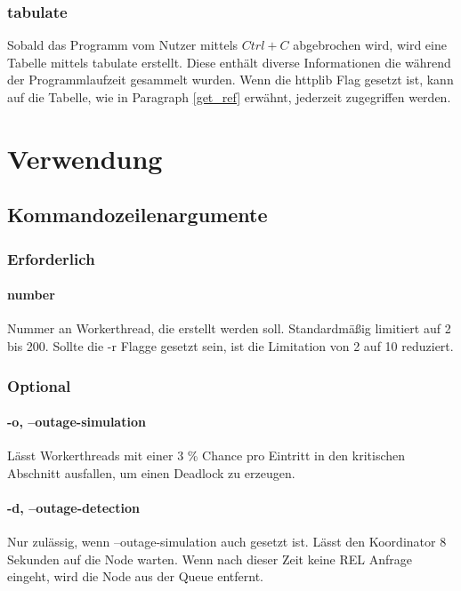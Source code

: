 \documentclass[12pt, letterpaper]{article}
\begin{document}
\subsubsection{tabulate}
Sobald das Programm vom Nutzer mittels $Ctrl+C$ abgebrochen wird, wird eine Tabelle mittels tabulate\cite{tabulate-ref} erstellt. Diese enthält diverse Informationen die während der Programmlaufzeit gesammelt wurden.
Wenn die httplib Flag gesetzt ist, kann auf die Tabelle, wie in Paragraph \ref{get_ref} erwähnt, jederzeit zugegriffen werden.

\section{Verwendung}
\label{usage}

\subsection{Kommandozeilenargumente}
\subsubsection{Erforderlich}

\paragraph{number}
Nummer an Workerthread, die erstellt werden soll. Standardmäßig limitiert auf 2 bis 200. Sollte die -r Flagge gesetzt sein, ist die Limitation von 2 auf 10 reduziert.

\subsubsection{Optional}
\paragraph{-o, --outage-simulation}
Lässt Workerthreads mit einer 3 \% Chance pro Eintritt in den kritischen Abschnitt ausfallen, um einen Deadlock zu erzeugen. 

\paragraph{-d, --outage-detection}
Nur zulässig, wenn --outage-simulation auch gesetzt ist. Lässt den Koordinator 8 Sekunden auf die Node warten. Wenn nach dieser Zeit keine REL Anfrage eingeht, wird die Node aus der Queue entfernt.
\end{document}
